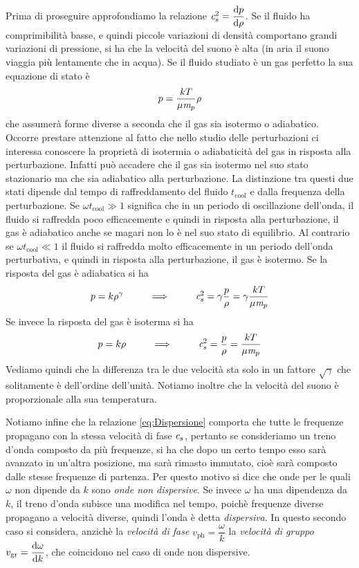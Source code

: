 Prima di proseguire approfondiamo la relazione $\textit{c}_{s}^2 = \dfrac{\mathrm{d} {p}}{\mathrm{d} {\rho}}$. Se il fluido ha comprimibilità basse, e quindi piccole variazioni di densità comportano grandi variazioni di pressione, si ha che la velocità del suono è alta (in aria il suono viaggia più lentamente che in acqua). Se il fluido studiato è un gas perfetto la sua equazione di stato è
\begin{equation}
p= \dfrac{k T}{\mu \textit{m}_{p}} \rho
\end{equation}
che assumerà forme diverse a seconda che il gas sia isotermo o adiabatico. Occorre prestare attenzione al fatto che nello studio delle perturbazioni ci interessa conoscere la proprietà di isotermia o adiabaticità del gas in risposta alla perturbazione. Infatti può accadere che il gas sia isotermo nel suo stato stazionario ma che sia adiabatico alla perturbazione. La distinzione tra questi due stati dipende dal tempo di raffreddamento del fluido $t_\mathrm{cool}$ e dalla frequenza della perturbazione. Se $\omega t_\mathrm{cool} \gg 1$ significa che in un periodo di oscillazione dell'onda, il fluido si raffredda poco efficacemente e quindi in risposta alla perturbazione, il gas è adiabatico anche se magari non lo è nel suo stato di equilibrio. Al contrario se 
$\omega t_\mathrm{cool} \ll 1$ il fluido si raffredda molto efficacemente in un periodo dell'onda perturbativa, e quindi in risposta alla perturbazione, il gas è isotermo. Se la risposta del gas è adiabatica si ha
\begin{equation}
p = k \rho^\gamma \,\,\,\,\,\,\,\,\,\,\,\,\,\,\,\, \Longrightarrow \,\,\,\,\,\,\,\,\,\,\,\,\,\,\,\, \textit{c}_{s}^2 = \gamma \dfrac{p}{\rho} = \gamma \dfrac{kT}{\mu \textit{m}_{p}}
\end{equation}
Se invece la risposta del gas è isoterma si  ha
\begin{equation}
p = k \rho \,\,\,\,\,\,\,\,\,\,\,\,\,\,\,\, \Longrightarrow \,\,\,\,\,\,\,\,\,\,\,\,\,\,\,\, \textit{c}_{s}^2 = \dfrac{p}{\rho} =  \dfrac{kT}{\mu \textit{m}_{p}} \label{eq:SuonoIsotermo}
\end{equation}
Vediamo quindi che la differenza tra le due velocità sta solo in un fattore $\sqrt{\gamma}$ che solitamente è dell'ordine dell'unità. Notiamo inoltre che la velocità del suono è proporzionale alla sua temperatura. 

Notiamo infine che la relazione \ref{eq:Dispersione} comporta che tutte le frequenze propagano con la stessa velocità di fase $\textit{c}_{s}$, pertanto se consideriamo un treno d'onda composto da più frequenze, si ha che dopo un certo tempo esso sarà avanzato in un'altra posizione, ma sarà rimasto immutato, cioè sarà composto dalle stesse frequenze di partenza. Per questo motivo si dice che onde per le quali $\omega$ non dipende da $k$ sono \textit{onde non dispersive}. Se invece $\omega$ ha una dipendenza da $k$, il treno d'onda subisce una modifica nel tempo, poichè frequenze diverse propagano a velocità diverse, quindi l'onda è detta \textit{dispersiva}. In questo secondo caso si considera, anzichè la \textit{velocità di fase} $v_\mathrm{ph} = \dfrac{\omega}{k}$ la \textit{velocità di gruppo} $ v_\mathrm{gr} = \dfrac{\mathrm{d} {\omega}}{\mathrm{d} {k}}$, che coincidono nel caso di onde non dispersive.



